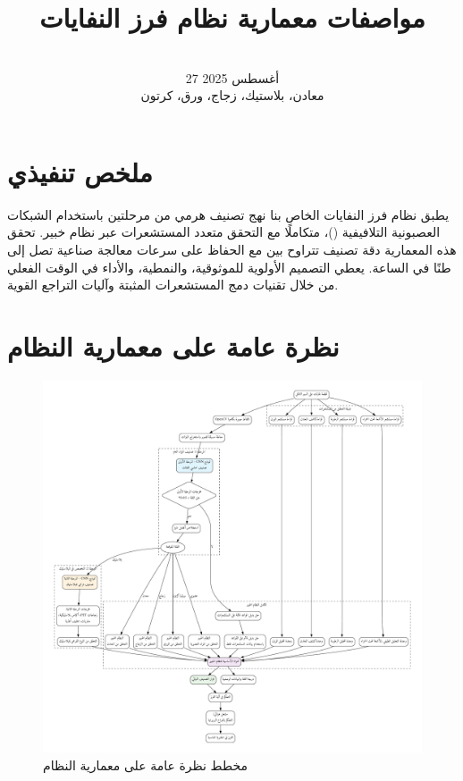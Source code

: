 \documentclass[11pt, a4paper]{article}
\title{مواصفات معمارية نظام فرز النفايات}
\author{
    \RL{\textbf{إصدار الوثيقة:}} \lr{1.0} \\
    \RL{\textbf{التاريخ:}} 27 أغسطس 2025 \\
    \RL{\textbf{التصنيف المستهدف:}} معادن، بلاستيك، زجاج، ورق، كرتون
}
\date{}
\begin{document}
\begin{RTL} %

\maketitle
\tableofcontents
\newpage

\section{ملخص تنفيذي}
يطبق نظام فرز النفايات الخاص بنا نهج تصنيف هرمي من مرحلتين باستخدام الشبكات العصبونية التلافيفية ()، متكاملًا مع التحقق متعدد المستشعرات عبر نظام خبير. تحقق هذه المعمارية دقة تصنيف تتراوح بين  مع الحفاظ على سرعات معالجة صناعية تصل إلى  طنًا في الساعة. يعطي التصميم الأولوية للموثوقية، والنمطية، والأداء في الوقت الفعلي من خلال تقنيات دمج المستشعرات المثبتة وآليات التراجع القوية.

\section{نظرة عامة على معمارية النظام}
\begin{figure}[h!]
\centering
\includegraphics[width=\textwidth]{architecture_ar.pdf}
\caption{مخطط نظرة عامة على معمارية النظام}
\label{fig:system_architecture}
\end{figure}


\end{RTL}
\end{document}
